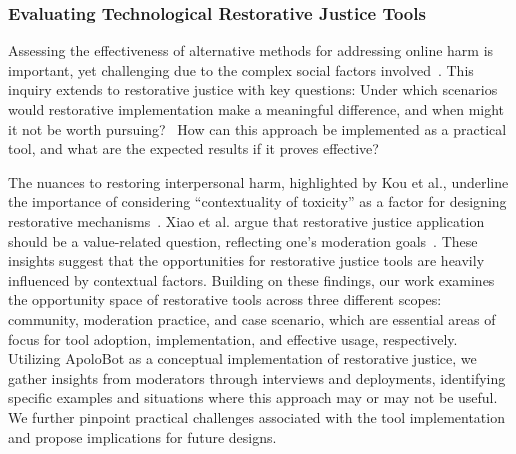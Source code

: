 \subsubsection{Evaluating Technological Restorative Justice Tools}
Assessing the effectiveness of alternative methods for addressing online harm is important, yet challenging due to the complex social factors involved~\cite{Ma2023, Aliyu2024}. This inquiry extends to restorative justice with key questions: Under which scenarios would restorative implementation make a meaningful difference, and when might it not be worth pursuing?~\cite{Cai2024} How can this approach be implemented as a practical tool, and what are the expected results if it proves effective?~\cite{Xiao2023}

The nuances to restoring interpersonal harm, highlighted by Kou et al., underline the importance of considering “contextuality of toxicity” as a factor for designing restorative mechanisms~\cite{Kou2021}. Xiao et al. argue that restorative justice application should be a value-related question, reflecting one’s moderation goals~\cite{Xiao2023}. These insights suggest that the opportunities for restorative justice tools are heavily influenced by contextual factors. Building on these findings, our work examines the opportunity space of restorative tools across three different scopes: community, moderation practice, and case scenario, which are essential areas of focus for tool adoption, implementation, and effective usage, respectively. Utilizing ApoloBot as a conceptual implementation of restorative justice, we gather insights from moderators through interviews and deployments, identifying specific examples and situations where this approach may or may not be useful. We further pinpoint practical challenges associated with the tool implementation and propose implications for future designs.
